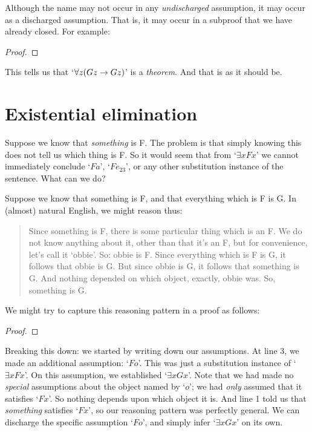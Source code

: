 Although the name may not occur in any \emph{undischarged} assumption, it may occur as a discharged assumption. That is, it may occur in a subproof that we have already closed. For example:
\begin{proof}
	\open
	\close
\end{proof}
This tells us that `$\forall z (Gz \rightarrow Gz)$' is a \emph{theorem}. And that is as it should be.

\section{Existential elimination}
Suppose we know that \emph{something} is F. The problem is that simply knowing this does not tell us which thing is F. So it would seem that from `$\exists x Fx$' we cannot immediately conclude `$Fa$', `$Fe_{23}$', or any other substitution instance of the sentence. What can we do?

Suppose we know that something is F, and that everything which is F is G. In (almost) natural English, we might reason thus:
	\begin{quote}
		Since something is F, there is some particular thing which is an F. We do not know anything about it, other than that it's an F, but for convenience, let's call it `obbie'. So: obbie is F. Since everything which is F is G, it follows that obbie is G. But since obbie is G, it follows that something is G. And nothing depended on which object, exactly, obbie was. So, something is G.
	\end{quote}
We might try to capture this reasoning pattern in a proof as follows:
\begin{proof}
	\open
		 
	\close
\end{proof}\noindent
Breaking this down: we started by writing down our assumptions. At line 3, we made an additional assumption: `$Fo$'. This was just a substitution instance of `$\exists x Fx$'. On this assumption, we established `$\exists x Gx$'. Note that we had made no \emph{special} assumptions about the object named by `$o$'; we had \emph{only} assumed that it satisfies `$Fx$'. So nothing depends upon which object it is. And line 1 told us that \emph{something} satisfies `$Fx$', so our reasoning pattern was perfectly general. We can discharge the specific assumption `$Fo$', and simply infer `$\exists x Gx$' on its own.

